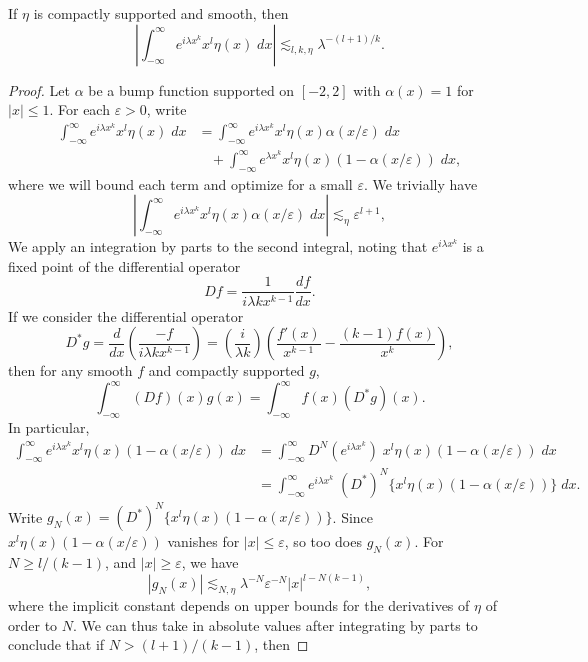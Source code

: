 \begin{lemma}
  If $\eta$ is compactly supported and smooth, then
  \[ \left| \int_{-\infty}^\infty e^{i \lambda x^k} x^l \eta(x)\; dx \right| \lesssim_{l,k,\eta} \lambda^{-(l + 1)/k}. \]
\end{lemma}
\begin{proof}
  Let $\alpha$ be a bump function supported on $[-2,2]$ with $\alpha(x) = 1$ for $|x| \leq 1$. For each $\varepsilon > 0$, write
  \begin{align*}
    \int_{-\infty}^\infty e^{i \lambda x^k} x^l \eta(x)\; dx &= \int_{-\infty}^\infty e^{i \lambda x^k} x^l \eta(x) \alpha(x/\varepsilon)\; dx\\
    &\ \ \ \ + \int_{-\infty}^\infty e^{\lambda x^k} x^l \eta(x) (1 - \alpha(x/\varepsilon))\; dx,
  \end{align*}
  where we will bound each term and optimize for a small $\varepsilon$. We trivially have
  \[ \left| \int_{-\infty}^\infty e^{i \lambda x^k} x^l \eta(x) \alpha(x/\varepsilon)\; dx \right| \lesssim_\eta \varepsilon^{l+1}, \]
  We apply an integration by parts to the second integral, noting that $e^{i \lambda x^k}$ is a fixed point of the differential operator
  \[ Df = \frac{1}{i \lambda k x^{k-1}} \frac{df}{dx}. \]
  If we consider the differential operator
  \[ D^*g = \frac{d}{dx} \left( \frac{-f}{i \lambda k x^{k-1}} \right) = \left( \frac{i}{\lambda k} \right) \left( \frac{f'(x)}{x^{k-1}} - \frac{(k-1) f(x)}{x^k} \right), \]
  then for any smooth $f$ and compactly supported $g$,
  \[ \int_{-\infty}^\infty (Df)(x) g(x) = \int_{-\infty}^\infty f(x) (D^* g)(x). \]
  In particular,
  \begin{align*}
    \int_{-\infty}^\infty e^{i \lambda x^k} x^l \eta(x) (1 - \alpha(x/\varepsilon))\; dx &= \int_{-\infty}^\infty D^N(e^{i \lambda x^k})\; x^l \eta(x) (1 - \alpha(x/\varepsilon))\; dx\\
    &= \int_{-\infty}^\infty e^{i \lambda x^k}\; (D^*)^N \{ x^l \eta(x) (1 - \alpha(x/\varepsilon)) \}\; dx.
  \end{align*}
  Write $g_N(x) = (D^*)^N \{ x^l \eta(x) (1 - \alpha(x/\varepsilon)) \}$. Since $x^l \eta(x) (1 - \alpha(x/\varepsilon))$ vanishes for $|x| \leq \varepsilon$, so too does $g_N(x)$. For $N \geq l/(k-1)$, and $|x| \geq \varepsilon$, we have
  \[ |g_N(x)| \lesssim_{N,\eta} \lambda^{-N} \varepsilon^{-N} |x|^{l - N(k-1)}, \]
  where the implicit constant depends on upper bounds for the derivatives of $\eta$ of order to $N$. We can thus take in absolute values after integrating by parts to conclude that if $N > (l+1)/(k-1)$, then

\end{proof}
